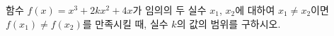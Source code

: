 함수 $f(x)=x^3+2kx^2+4x$가 임의의 두 실수 $x_1$, $x_2$에 대하여 $x_1\ne x_2$이면 $f(x_1)\ne f(x_2)$를 만족시킬 때, 실수 $k$의 값의 범위를 구하시오.
